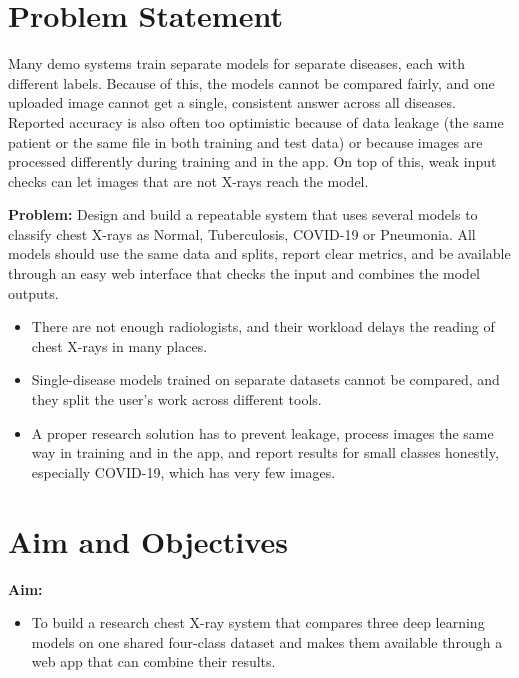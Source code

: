 \section{Problem Statement}

Many demo systems train separate models for separate diseases, each with different labels. Because of this, the models cannot be compared fairly, and one uploaded image cannot get a single, consistent answer across all diseases. Reported accuracy is also often too optimistic because of data leakage (the same patient or the same file in both training and test data) or because images are processed differently during training and in the app. On top of this, weak input checks can let images that are not X-rays reach the model.

\textbf{Problem:} Design and build a repeatable system that uses several models to classify chest X-rays as Normal, Tuberculosis, COVID-19 or Pneumonia. All models should use the same data and splits, report clear metrics, and be available through an easy web interface that checks the input and combines the model outputs.

\begin{itemize}
    \item There are not enough radiologists, and their workload delays the reading of chest X-rays in many places.
    \item Single-disease models trained on separate datasets cannot be compared, and they split the user's work across different tools.
    \item A proper research solution has to prevent leakage, process images the same way in training and in the app, and report results for small classes honestly, especially COVID-19, which has very few images.
\end{itemize}

\section{Aim and Objectives}

\textbf{Aim:}
\begin{itemize}
    \item To build a research chest X-ray system that compares three deep learning models on one shared four-class dataset and makes them available through a web app that can combine their results.
\end{itemize}

